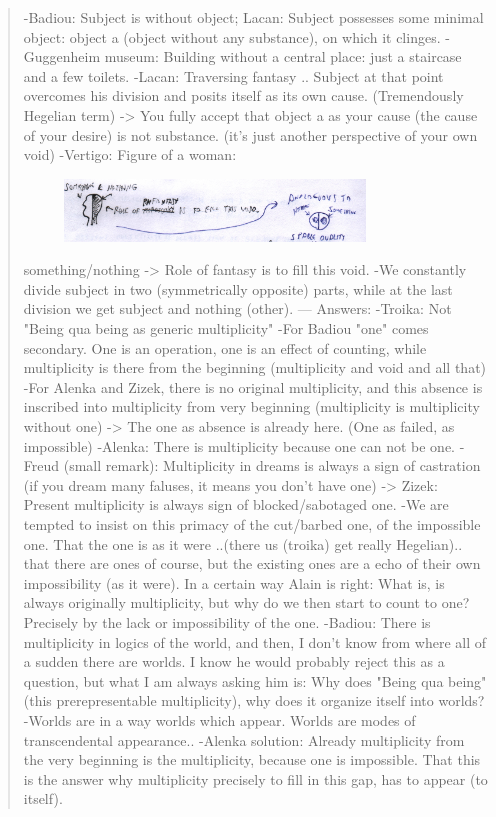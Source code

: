 \documentclass[10pt]{book}
\begin{document}
\begin{quotation}
-Badiou: Subject is without object; Lacan: Subject possesses some minimal object: object a (object without any substance), on which it clinges.
-Guggenheim museum: Building without a central place: just a staircase and a few toilets.
-Lacan: Traversing fantasy .. Subject at that point overcomes his division and posits itself as its own cause. (Tremendously Hegelian term) -> You fully accept that object a as your cause (the cause of your desire) is not substance. (it's just another perspective of your own void)
-Vertigo: Figure of a woman:
\begin{figure}[ht!]
\centering
\includegraphics[width=80mm]{scan14.jpg}
\label{overflow}
\end{figure}
 something/nothing -> Role of fantasy is to fill this void.
-We constantly divide subject in two (symmetrically opposite) parts, while at the last division we get subject and nothing (other).
---
Answers:
-Troika: Not "Being qua being as generic multiplicity"
-For Badiou "one" comes secondary. One is an operation, one is an effect of counting, while multiplicity is there from the beginning (multiplicity and void and all that)
-For Alenka and Zizek, there is no original multiplicity, and this absence is inscribed into multiplicity from very beginning (multiplicity is multiplicity without one) -> The one as absence is already here. (One as failed, as impossible)
-Alenka: There is multiplicity because one can not be one.
-Freud (small remark): Multiplicity in dreams is always a sign of castration (if you dream many faluses, it means you don't have one) -> Zizek: Present multiplicity is always sign of blocked/sabotaged one.
-We are tempted to insist on this primacy of the cut/barbed one, of the impossible one. That the one is as it were ..(there us (troika) get really Hegelian).. that there are ones of course, but the existing ones are a echo of their own impossibility (as it were). In a certain way Alain is right: What is, is always originally multiplicity, but why do we then start to count to one? Precisely by the lack or impossibility of the one.
-Badiou: There is multiplicity in logics of the world, and then, I don't know from where all of a sudden there are worlds. I know he would probably reject this as a question, but what I am always asking him is: Why does "Being qua being" (this prerepresentable multiplicity), why does it organize itself into worlds? -Worlds are in a way worlds which appear. Worlds are modes of transcendental appearance.. -Alenka solution: Already multiplicity from the very beginning is the multiplicity, because one is impossible. That this is the answer why multiplicity precisely to fill in this gap, has to appear (to itself).

\end{quotation}
\end{document}
